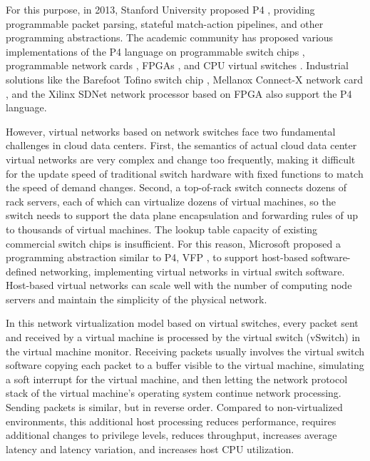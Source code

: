 For this purpose, in 2013, Stanford University proposed P4 \cite{bosshart2014p4}, providing programmable packet parsing, stateful match-action pipelines, and other programming abstractions. The academic community has proposed various implementations of the P4 language on programmable switch chips \cite{bosshart2013forwarding}, programmable network cards \cite{kaufmann2016high}, FPGAs \cite{wang2017p4fpga}, and CPU virtual switches \cite{shahbaz2016pisces}. Industrial solutions like the Barefoot Tofino switch chip \cite{barefoot-tofino}, Mellanox Connect-X network card \cite{mellanox}, and the Xilinx SDNet network processor based on FPGA \cite{xilinx-p4} also support the P4 language.

However, virtual networks based on network switches face two fundamental challenges in cloud data centers. First, the semantics of actual cloud data center virtual networks are very complex and change too frequently, making it difficult for the update speed of traditional switch hardware with fixed functions to match the speed of demand changes. Second, a top-of-rack switch connects dozens of rack servers, each of which can virtualize dozens of virtual machines, so the switch needs to support the data plane encapsulation and forwarding rules of up to thousands of virtual machines. The lookup table capacity of existing commercial switch chips is insufficient. For this reason, Microsoft proposed a programming abstraction similar to P4, VFP \cite{firestone2017vfp}, to support host-based software-defined networking, implementing virtual networks in virtual switch software. Host-based virtual networks can scale well with the number of computing node servers and maintain the simplicity of the physical network.

In this network virtualization model based on virtual switches, every packet sent and received by a virtual machine is processed by the virtual switch (vSwitch) in the virtual machine monitor. Receiving packets usually involves the virtual switch software copying each packet to a buffer visible to the virtual machine, simulating a soft interrupt for the virtual machine, and then letting the network protocol stack of the virtual machine's operating system continue network processing. Sending packets is similar, but in reverse order. Compared to non-virtualized environments, this additional host processing reduces performance, requires additional changes to privilege levels, reduces throughput, increases average latency and latency variation, and increases host CPU utilization.


